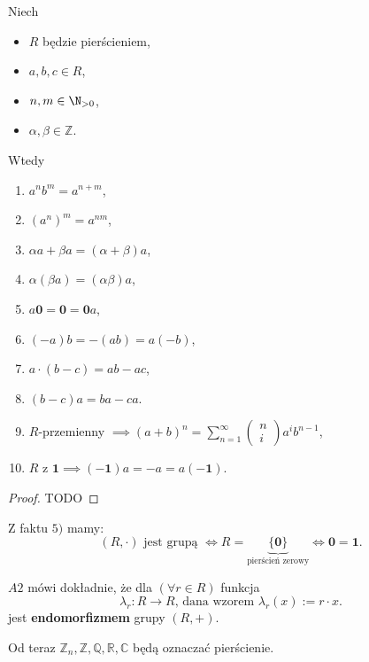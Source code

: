 \begin{fact}
	Niech 
	\begin{itemize}
		\item $R$ będzie pierścieniem,
		\item $a,b,c \in R$,
		\item $n,m \in \N_{>0}$,
		\item $\alpha , \beta \in \mathbb{Z} $.
	\end{itemize}
	Wtedy
	\begin{enumerate}[label=\arabic*)]
		\item $a^{n}b^{m} = a^{n+m}$,
		\item $\left( a^{n} \right)^{m} = a^{nm}$,
		\item $\alpha a + \beta a = \left( \alpha +\beta  \right) a$,
		\item $\alpha \left( \beta a \right) = \left( \alpha \beta  \right) a$,
		\item $a\mathbf{0} = \mathbf{0} = \mathbf{0}a$,
		\item $\left( -a \right) b = -\left( ab \right) = a\left( -b \right) $,
		\item $a\cdot \left(b-c  \right) = ab-ac$,
		\item $\left( b-c \right) a = ba-ca$.
		\item $R$-przemienny $\implies \left( a+b \right)^{n} = \sum_{n = 1}^{\infty} \begin{pmatrix} n \\ i \end{pmatrix} a^{i}b^{n-1}$,
		\item $R$ z $\mathbf{1} \implies \left( -\mathbf{1} \right) a = -a = a\left( -\mathbf{1} \right) $.
	\end{enumerate}
\end{fact}
\begin{proof}
	TODO
\end{proof} 
\begin{remark}
	Z faktu $5)$ mamy: 
	\[
		\left( R, \cdot  \right) \text{ jest grupą }\iff R = \underbrace{ \{\mathbf{0}\} }_{\text{pierścień zerowy}}\iff \mathbf{0} = \mathbf{1}
	.\] 
\end{remark} 
\begin{remark}
	$A2$ mówi dokładnie, że dla  $\left(\forall r\in R \right) $ funkcja
	\[
	\lambda_{r}: R \to R\text{, dana wzorem } \lambda_{r}\left( x \right) := r\cdot x
	.\] 
	jest \textbf{endomorfizmem} grupy $\left( R,+ \right) $.
\end{remark} 
\begin{remark}
	Od teraz  $\mathbb{Z} _{n}, \mathbb{Z} ,\mathbb{Q} ,\mathbb{R} ,\mathbb{C} $ będą oznaczać pierścienie.
\end{remark} 

